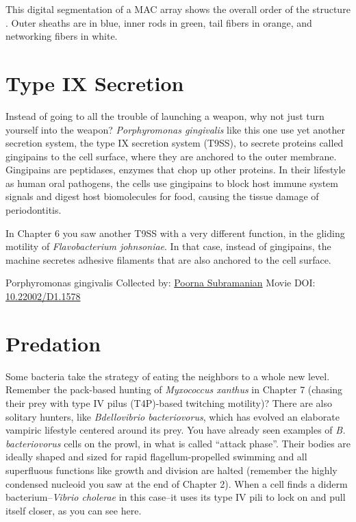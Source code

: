 \documentclass[]{tufte-book}
\begin{document}
This digital segmentation of a MAC array shows the overall order of the structure \citep{shikuma2014}. Outer sheaths are in blue, inner rods in green, tail fibers in orange, and networking fibers in white.

\hypertarget{type-ix-secretion}{%
\section{Type IX Secretion}\label{type-ix-secretion}}

Instead of going to all the trouble of launching a weapon, why not just turn yourself into the weapon? \emph{Porphyromonas gingivalis} like this one use yet another secretion system, the type IX secretion system (T9SS), to secrete proteins called gingipains to the cell surface, where they are anchored to the outer membrane. Gingipains are peptidases, enzymes that chop up other proteins. In their lifestyle as human oral pathogens, the cells use gingipains to block host immune system signals and digest host biomolecules for food, causing the tissue damage of periodontitis.

In Chapter 6 you saw another T9SS with a very different function, in the gliding motility of \emph{Flavobacterium johnsoniae}. In that case, instead of gingipains, the machine secretes adhesive filaments that are also anchored to the cell surface.



\hypertarget{htmlwidget-eaffd1eb78e30eae1262}{}

\label{fig:9-8}Porphyromonas gingivalis Collected by: \protect\hyperlink{poorna_subramanian}{Poorna Subramanian} Movie DOI: \href{https://doi.org/10.22002/D1.1578}{10.22002/D1.1578}

\hypertarget{predation}{%
\section{Predation}\label{predation}}

Some bacteria take the strategy of eating the neighbors to a whole new level. Remember the pack-based hunting of \emph{Myxococcus xanthus} in Chapter 7 (chasing their prey with type IV pilus (T4P)-based twitching motility)? There are also solitary hunters, like \emph{Bdellovibrio bacteriovorus}, which has evolved an elaborate vampiric lifestyle centered around its prey. You have already seen examples of \emph{B. bacteriovorus} cells on the prowl, in what is called ``attack phase''. Their bodies are ideally shaped and sized for rapid flagellum-propelled swimming and all superfluous functions like growth and division are halted (remember the highly condensed nucleoid you saw at the end of Chapter 2). When a cell finds a diderm bacterium--\emph{Vibrio cholerae} in this case--it uses its type IV pili to lock on and pull itself closer, as you can see here.
\end{document}
